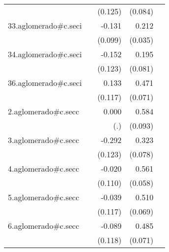 {\begin{longtable}{l*{4}{D{.}{.}{-1}}}
            &                     &     (0.125)         &     (0.084)         &                     \\
\addlinespace
33.aglomerado#c.seci&                     &      -0.131         &       0.212\sym{***}&                     \\
            &                     &     (0.099)         &     (0.035)         &                     \\
\addlinespace
34.aglomerado#c.seci&                     &      -0.152         &       0.195\sym{*}  &                     \\
            &                     &     (0.123)         &     (0.081)         &                     \\
\addlinespace
36.aglomerado#c.seci&                     &       0.133         &       0.471\sym{***}&                     \\
            &                     &     (0.117)         &     (0.071)         &                     \\
\addlinespace
2.aglomerado#c.secc&                     &       0.000         &       0.584\sym{***}&                     \\
            &                     &         (.)         &     (0.093)         &                     \\
\addlinespace
3.aglomerado#c.secc&                     &      -0.292\sym{*}  &       0.323\sym{***}&                     \\
            &                     &     (0.123)         &     (0.078)         &                     \\
\addlinespace
4.aglomerado#c.secc&                     &      -0.020         &       0.561\sym{***}&                     \\
            &                     &     (0.110)         &     (0.058)         &                     \\
\addlinespace
5.aglomerado#c.secc&                     &      -0.039         &       0.510\sym{***}&                     \\
            &                     &     (0.117)         &     (0.069)         &                     \\
\addlinespace
6.aglomerado#c.secc&                     &      -0.089         &       0.485\sym{***}&                     \\
            &                     &     (0.118)         &     (0.071)         &                     \\

\end{longtable}}
